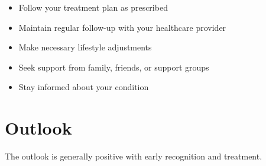 \begin{itemize}[noitemsep]
  \item Follow your treatment plan as prescribed
  \item Maintain regular follow-up with your healthcare provider
  \item Make necessary lifestyle adjustments
  \item Seek support from family, friends, or support groups
  \item Stay informed about your condition
\end{itemize}
\section{Outlook}
The outlook is generally positive with early recognition and treatment.
